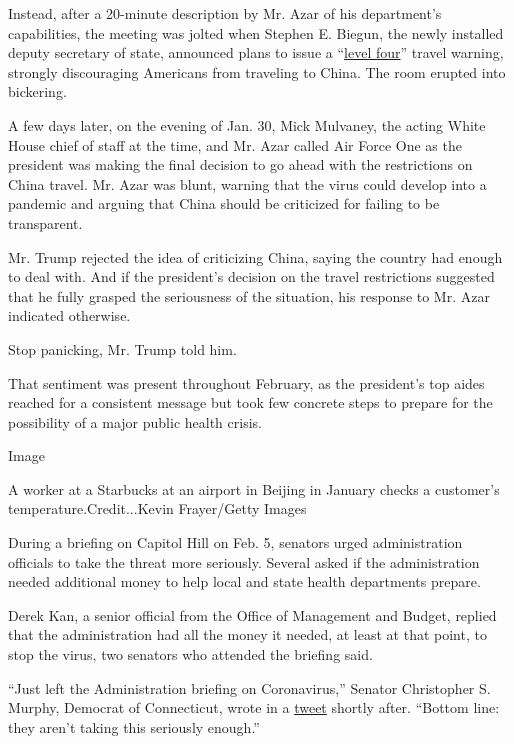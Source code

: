Instead, after a 20-minute description by Mr. Azar of his department's
capabilities, the meeting was jolted when Stephen E. Biegun, the newly
installed deputy secretary of state, announced plans to issue a
``\href{https://travel.state.gov/content/travel/en/traveladvisories/ea/travel-advisory-alert-global-level-4-health-advisory-issue.html}{level
four}'' travel warning, strongly discouraging Americans from traveling
to China. The room erupted into bickering.

A few days later, on the evening of Jan. 30, Mick Mulvaney, the acting
White House chief of staff at the time, and Mr. Azar called Air Force
One as the president was making the final decision to go ahead with the
restrictions on China travel. Mr. Azar was blunt, warning that the virus
could develop into a pandemic and arguing that China should be
criticized for failing to be transparent.

Mr. Trump rejected the idea of criticizing China, saying the country had
enough to deal with. And if the president's decision on the travel
restrictions suggested that he fully grasped the seriousness of the
situation, his response to Mr. Azar indicated otherwise.

Stop panicking, Mr. Trump told him.

That sentiment was present throughout February, as the president's top
aides reached for a consistent message but took few concrete steps to
prepare for the possibility of a major public health crisis.

Image

A worker at a Starbucks at an airport in Beijing in January checks a
customer's temperature.Credit...Kevin Frayer/Getty Images

During a briefing on Capitol Hill on Feb. 5, senators urged
administration officials to take the threat more seriously. Several
asked if the administration needed additional money to help local and
state health departments prepare.

Derek Kan, a senior official from the Office of Management and Budget,
replied that the administration had all the money it needed, at least at
that point, to stop the virus, two senators who attended the briefing
said.

``Just left the Administration briefing on Coronavirus,'' Senator
Christopher S. Murphy, Democrat of Connecticut, wrote in a
\href{https://twitter.com/chrismurphyct/status/1225073987639705600?lang=en}{tweet}
shortly after. ``Bottom line: they aren't taking this seriously
enough.''


